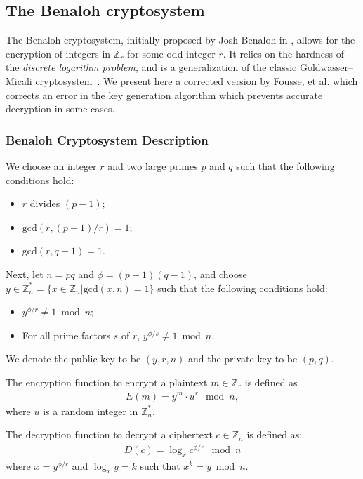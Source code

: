 \subsection{The Benaloh cryptosystem}
The Benaloh cryptosystem, initially proposed by Josh Benaloh in \cite{benaloh_dense_1994}, allows for the encryption of integers in $\mathbb{Z}_r$ for some odd integer $r$. It relies on the hardness of the \textit{discrete logarithm problem}, and is a generalization of the classic Goldwasser--Micali cryptosystem~\cite{goldwasser_probabilistic_1984}. We present here a corrected version by Fousse, et al. \cite{fousse_benalohs_2010} which corrects an error in the key generation algorithm which prevents accurate decryption in some cases.

\subsubsection{Benaloh Cryptosystem Description}
We choose an integer $r$ and two large primes $p$ and $q$ such that the following conditions hold:
\begin{itemize}
  \item $r$ divides $(p-1)$;
  \item $\mathrm{gcd}(r,(p-1)/r)=1$;
  \item $\mathrm{gcd}(r,q-1)=1$.
\end{itemize}
Next, let $n=pq$ and $\phi = (p-1)(q-1)$, and choose $y\in \mathbb{Z}_n^* = \{ x \in \mathbb{Z}_n | \mathrm{gcd}(x,n)=1 \}$ such that the following conditions hold:
\begin{itemize}
  \item $y^{\phi/r}\neq 1 \bmod n$;
  \item For all prime factors $s$ of $r$, $y^{\phi/s}\neq 1 \bmod n$.
\end{itemize}
We denote the public key to be $(y,r,n)$ and the private key to be $(p,q)$.

The encryption function to encrypt a plaintext $m \in \mathbb{Z}_r$ is defined as
\begin{align*}
  E(m) = y^m \cdot u^r \mod{n},
\end{align*}
where $u$ is a random integer in $\mathbb{Z}_n^*$.

The decryption function to decrypt a ciphertext $c \in \mathbb{Z}_{n}$ is defined as:
\begin{align*}
  D(c) = \log_x{c^{\phi/r}} \mod n
\end{align*}
where $x = y^{\phi/r}$ and $\log_x{y} = k$ such that $x^k = y \bmod n$.

